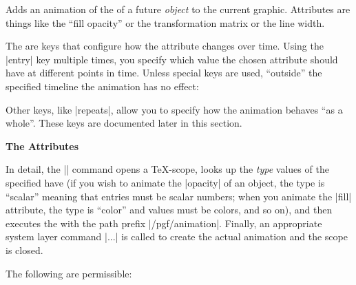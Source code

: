 \begin{command}{\pgfanimateattribute{}}
    Adds an animation of the  of a future \emph{object} to the
    current graphic. Attributes are things like the ``fill opacity'' or the
    transformation matrix or the line width.

    The  are keys that configure how the attribute changes over
    time. Using the |entry| key multiple times, you specify which value the
    chosen attribute should have at different points in time. Unless special
    keys are used, ``outside'' the specified timeline the animation has no
    effect:
\begin{codeexample}[
    preamble={\usepgfmodule{animations}},
    animation list={0.5,1,1.5,2,2.5},
]
\end{codeexample}

    Other keys, like |repeats|, allow you to specify how the animation behaves
    ``as a whole''. These keys are documented later in this section.


    \medskip
    \textbf{The Attributes}

    In detail, the |\pgfanimateattribute| command opens a \TeX-scope, looks up
    the \emph{type} values of the specified  have (if you wish
    to animate the |opacity| of an object, the type is ``scalar'' meaning that
    entries must be scalar numbers; when you animate the |fill| attribute, the
    type is ``color'' and values must be colors, and so on), and then executes
    the  with the path prefix |/pgf/animation|. Finally, an
    appropriate system layer command |\pgfsysanimate...| is called to create
    the actual animation and the scope is closed.

    The following  are permissible:


\end{command}
